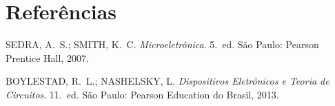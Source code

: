 \documentclass[11pt,a4paper]{article}
\begin{document}
\section{Referências}

\begin{referencias}
\item SEDRA, A.~S.; SMITH, K.~C. \emph{Microeletrônica}. 5.~ed. São Paulo: Pearson
  Prentice Hall, 2007.
\item BOYLESTAD, R.~L.; NASHELSKY, L. \emph{Dispositivos Eletrônicos e Teoria de
  Circuitos}. 11.~ed. São Paulo: Pearson Education do Brasil, 2013.
\end{referencias}
\end{document}
